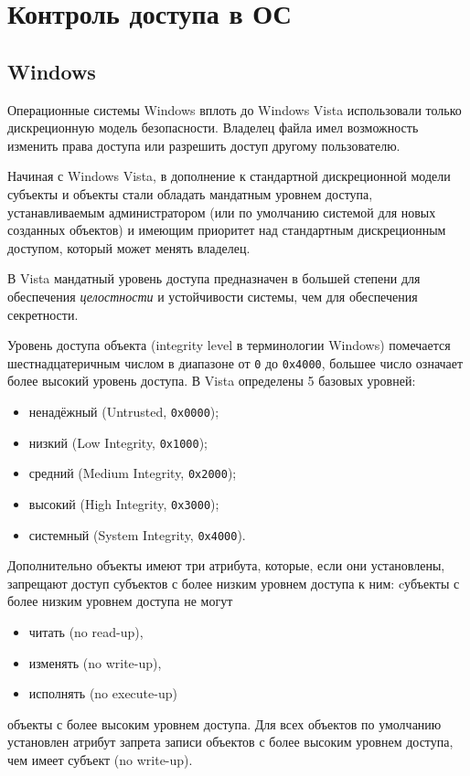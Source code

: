 \section{Контроль доступа в ОС}

\subsection{Windows}

Операционные системы Windows вплоть до Windows Vista использовали только дискреционную модель безопасности. Владелец файла имел возможность изменить права доступа или разрешить доступ другому пользователю.

Начиная с Windows Vista, в дополнение к стандартной дискреционной модели субъекты и объекты стали обладать мандатным уровнем доступа, устанавливаемым администратором (или по умолчанию системой для новых созданных объектов) и имеющим приоритет над стандартным дискреционным доступом, который может менять владелец.

В Vista мандатный уровень доступа предназначен в большей степени для обеспечения \emph{целостности} и устойчивости системы, чем для обеспечения секретности.

Уровень доступа объекта (integrity level в терминологии Windows) помечается шестнадцатеричным числом в диапазоне от \texttt{0} до \texttt{0x4000}, большее число означает более высокий уровень доступа. В Vista определены 5 базовых уровней:
\begin{itemize}
    \item ненадёжный (Untrusted, \texttt{0x0000});
    \item низкий (Low Integrity, \texttt{0x1000});
    \item средний (Medium Integrity, \texttt{0x2000});
    \item высокий (High Integrity, \texttt{0x3000});
    \item системный (System Integrity, \texttt{0x4000}).
\end{itemize}

Дополнительно объекты имеют три атрибута, которые, если они установлены, запрещают доступ субъектов с более низким уровнем доступа к ним: cубъекты с более низким уровнем доступа не могут
\begin{itemize}
    \item читать (no read-up),
    \item изменять (no write-up),
    \item исполнять (no execute-up)
\end{itemize}
объекты с более высоким уровнем доступа. Для всех объектов по умолчанию установлен атрибут запрета записи объектов с более высоким уровнем доступа, чем имеет субъект (no write-up).

